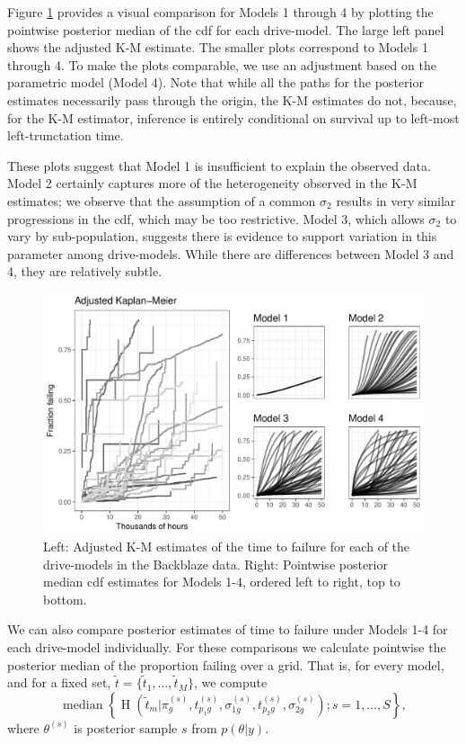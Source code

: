 \documentclass[12pt]{article}
\newcommand{\op}{\operatorname}
\begin{document}
Figure \ref{fig:fig2} provides a visual comparison for Models 1 through 4 by plotting the pointwise posterior median of the cdf for each drive-model.  The large left panel shows the adjusted K-M estimate.  The smaller plots correspond to Models 1 through 4.  To make the plots comparable, we use an adjustment based on the parametric model (Model 4).  Note that while all the paths for the posterior estimates necessarily pass through the origin, the K-M estimates do not, because, for the K-M estimator, inference is entirely conditional on survival up to left-most left-trunctation time.

These plots suggest that Model 1 is insufficient to explain the observed data. Model 2 certainly captures more of the heterogeneity observed in the K-M estimates; we observe that the assumption of a common $\sigma_2$ results in very similar progressions in the cdf, which may be too restrictive. Model 3, which allows $\sigma_2$ to vary by sub-population, suggests there is evidence to support variation in this parameter among drive-models. While there are differences between Model 3 and 4, they are relatively subtle.

\begin{figure}[H]
\includegraphics[width=\textwidth]{heterogeneity-compare}
\caption{Left: Adjusted K-M estimates of the time to failure for each of the drive-models in the Backblaze data. Right: Pointwise posterior median cdf estimates for Models 1-4, ordered left to right, top to bottom.}
\label{fig:fig2}
\end{figure}

We can also compare posterior estimates of time to failure under Models 1-4 for each drive-model individually.  For these comparisons we calculate pointwise the posterior median of the proportion failing over a grid. That is, for every model, and for a fixed set, $\tilde{t}=\{\tilde{t}_1,\ldots,\tilde{t}_M\}$, we compute 
\begin{equation}
\label{pointwise-medians}
\op{median}\left\{\op{H}\left(\tilde{t}_m|\pi_{g}^{(s)},t_{p_{1}g}^{(s)},\sigma_{1g}^{(s)},t_{p_{2}g}^{(s)},\sigma_{2g}^{(s)}\right);s=1,\ldots,S \right\},
\end{equation}
where $\theta^{(s)}$ is posterior sample $s$ from $p(\theta|y)$.
\end{document}
